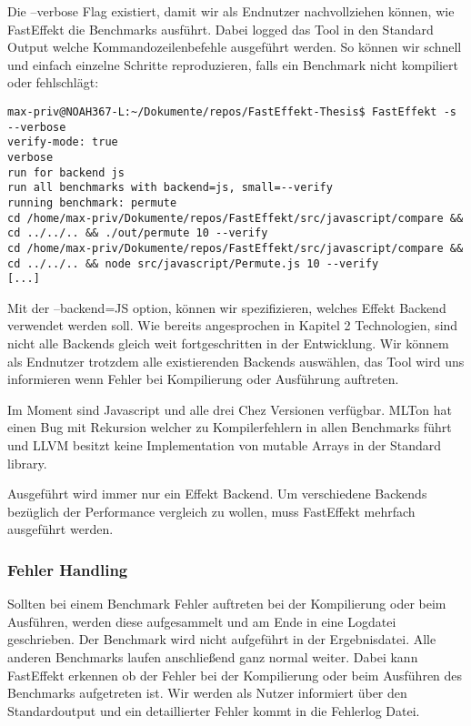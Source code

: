Die --verbose Flag existiert, damit wir als Endnutzer nachvollziehen können, wie FastEffekt die Benchmarks ausführt. Dabei logged das Tool in den Standard Output welche Kommandozeilenbefehle ausgeführt werden. So können wir schnell und einfach einzelne Schritte reproduzieren, falls ein Benchmark nicht kompiliert oder fehlschlägt:

\begin{lstlisting}
max-priv@NOAH367-L:~/Dokumente/repos/FastEffekt-Thesis$ FastEffekt -s --verbose
verify-mode: true
verbose
run for backend js
run all benchmarks with backend=js, small=--verify
running benchmark: permute
cd /home/max-priv/Dokumente/repos/FastEffekt/src/javascript/compare && cd ../../.. && ./out/permute 10 --verify
cd /home/max-priv/Dokumente/repos/FastEffekt/src/javascript/compare && cd ../../.. && node src/javascript/Permute.js 10 --verify
[...]
\end{lstlisting}

Mit der --backend=JS option, können wir spezifizieren, welches Effekt Backend verwendet werden soll. Wie bereits angesprochen in %
Kapitel 2 Technologien, sind nicht alle Backends gleich weit fortgeschritten in der Entwicklung. Wir könnem als Endnutzer trotzdem alle existierenden Backends auswählen, das Tool wird uns informieren wenn Fehler bei Kompilierung oder Ausführung auftreten.

Im Moment sind Javascript und alle drei Chez Versionen verfügbar.
MLTon hat einen Bug mit Rekursion welcher zu Kompilerfehlern in allen Benchmarks führt und LLVM besitzt keine Implementation von mutable Arrays in der Standard library.

Ausgeführt wird immer nur ein Effekt Backend. Um verschiedene Backends bezüglich der Performance vergleich zu wollen, muss FastEffekt mehrfach ausgeführt werden.


\subsubsection{Fehler Handling}
Sollten bei einem Benchmark Fehler auftreten bei der Kompilierung oder beim Ausführen, werden diese aufgesammelt und am Ende in eine Logdatei geschrieben.
Der Benchmark wird nicht aufgeführt in der Ergebnisdatei.
Alle anderen Benchmarks laufen anschließend ganz normal weiter.
Dabei kann FastEffekt erkennen ob der Fehler bei der Kompilierung oder beim Ausführen des Benchmarks aufgetreten ist. Wir werden als Nutzer informiert über den Standardoutput und ein detaillierter Fehler kommt in die Fehlerlog Datei.

